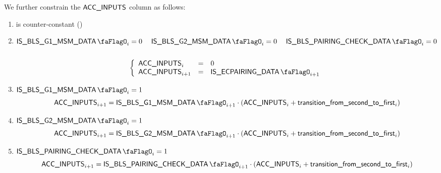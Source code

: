 We further constrain the $\textsf{ACC\_INPUTS}$ column as follows:
\begin{enumerate}
    \item \accInputs{} is counter-constant \quad (\trash)

    \item \If $\isBlsGOneMsmData_{i} = 0$ \et~ $\isBlsGTwoMsmData_{i} = 0$ \et~ $\isBlsPairingCheckData_{i} = 0$ ~\Then
        \[
            \left\{ \begin{array}{lcl}
                \accInputs_{i}     & = & 0                        \\
                \accInputs_{i + 1} & = & \isEcpairingData_{i + 1} \\
            \end{array} \right.
        \]
    
    \item \If $\isBlsGOneMsmData_{i} = 1$ \Then
        \[
            \accInputs_{i+1}
            =
            \isBlsGOneMsmData_{i+1} \cdot (\accInputs_{i} + \locTransitionFromSecondToFirst_{i})
        \]

    \item \If $\isBlsGTwoMsmData_{i} = 1$ \Then
        \[
            \accInputs_{i+1}
            =
            \isBlsGTwoMsmData_{i+1} \cdot (\accInputs_{i} + \locTransitionFromSecondToFirst_{i})
        \]

    \item \If $\isBlsPairingCheckData_{i} = 1$ \Then
        \[
            \accInputs_{i+1}
            =
            \isBlsPairingCheckData_{i+1} \cdot (\accInputs_{i} + \locTransitionFromSecondToFirst_{i})
        \]
\end{enumerate}